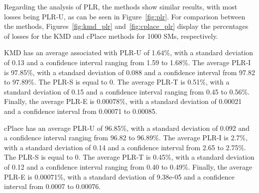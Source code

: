 \documentclass[a4paper,fleqn]{cas-dc}
\begin{document}
Regarding the analysis of \gls{PLR}, the methods show similar results, with most losses being PLR-U, as can be seen in Figure~\ref{fig:plr}. For comparison between the methods, Figures~\ref{fig:kmd_plr} and~\ref{fig:cplace_plr} display the percentages of losses for the KMD and cPlace methods for 1000 \gls{SMs}, respectively.

KMD has an average associated with PLR-U of 1.64\%, with a standard deviation of 0.13 and a confidence interval ranging from 1.59 to 1.68\%. The average PLR-I is 97.85\%, with a standard deviation of 0.088 and a confidence interval from 97.82 to 97.89\%. The PLR-S is equal to 0. The average PLR-T is 0.51\%, with a standard deviation of 0.15 and a confidence interval ranging from 0.45 to 0.56\%. Finally, the average PLR-E is 0.00078\%, with a standard deviation of 0.00021 and a confidence interval from 0.00071 to 0.00085.

cPlace has an average PLR-U of 96.85\%, with a standard deviation of 0.092 and a confidence interval ranging from 96.82 to 96.89\%. The average PLR-I is 2.7\%, with a standard deviation of 0.14 and a confidence interval from 2.65 to 2.75\%. The PLR-S is equal to 0. The average PLR-T is 0.45\%, with a standard deviation of 0.12 and a confidence interval ranging from 0.40 to 0.49\%. Finally, the average PLR-E is 0.00071\%, with a standard deviation of 9.38e-05 and a confidence interval from 0.0007 to 0.00076.
\end{document}
